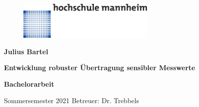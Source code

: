 \begin{titlepage}
\thispagestyle{empty}
\begin{center}


\begin{figure}[h]
    \centering
        
       \includegraphics[width=0.6\textwidth]{Pictures/hm_4C_L_1-4.eps}
    
 \end{figure}





\vspace*{2.5cm}
\begin{LARGE}
\textbf{Julius Bartel}
\end{LARGE}

\bigskip

\begin{Huge} 
\textbf{Entwicklung robuster Übertragung sensibler Messwerte}
\end{Huge}


\par\bigskip

\begin{large}
    \textbf{Bachelorarbeit}
\end{large}

\vspace{12cm}
Sommersemester 2021 Betreuer: Dr. Trebbels




\end{center}

\end{titlepage}
